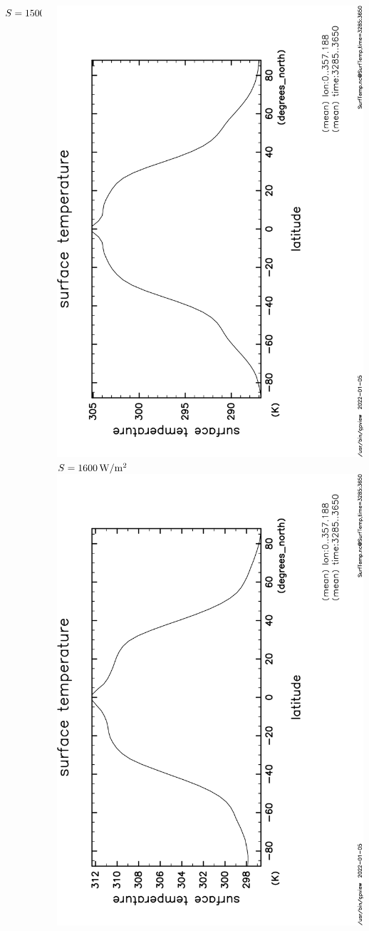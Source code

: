 \documentclass[aspectratio=149,9pt,fleqn]{beamer}
\begin{document}
\begin{frame}
\begin{columns}[T]
\begin{column}{.3\textwidth}
			\(S=1500\hmu{W/m^2}\)
		\end{column}
		\begin{column}{.3\textwidth}
			\centering
			\includegraphics[height=\textwidth,angle=-90]{S1600/SurfTemp,time=3285:3650-crop.pdf}
			\(S=1600\hmu{W/m^2}\)\\
			\includegraphics[height=\textwidth,angle=-90]{S1800/SurfTemp,time=3285:3650-crop.pdf}

\end{column}
\end{columns}
\end{frame}
\end{document}
